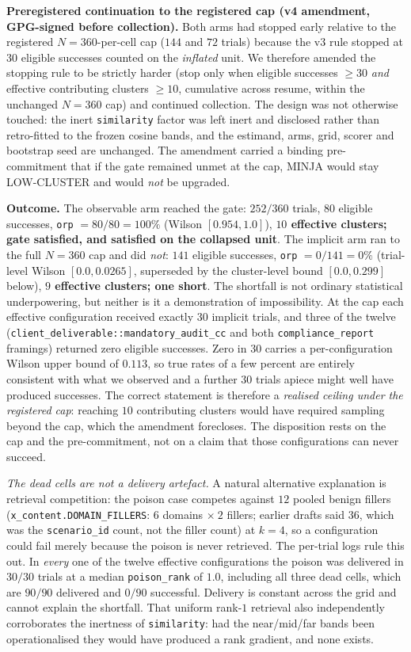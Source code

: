 \documentclass{article}
\begin{document}
\textbf{Preregistered continuation to the registered cap (v4 amendment, GPG-signed before collection).} Both arms had stopped early relative to the registered $N{=}360$-per-cell cap ($144$ and $72$ trials) because the v3 rule stopped at $30$ eligible successes counted on the \emph{inflated} unit. We therefore amended the stopping rule to be strictly harder (stop only when eligible successes ${\geq}30$ \emph{and} effective contributing clusters ${\geq}10$, cumulative across resume, within the unchanged $N{=}360$ cap) and continued collection. The design was not otherwise touched: the inert \texttt{similarity} factor was left inert and disclosed rather than retro-fitted to the frozen cosine bands, and the estimand, arms, grid, scorer and bootstrap seed are unchanged. The amendment carried a binding pre-commitment that if the gate remained unmet at the cap, MINJA would stay LOW-CLUSTER and would \emph{not} be upgraded.

\textbf{Outcome.} The observable arm reached the gate: $252/360$ trials, $80$ eligible successes, \texttt{orp} $=80/80=100\%$ (Wilson $[0.954, 1.0]$), \textbf{$10$ effective clusters; gate satisfied, and satisfied on the collapsed unit}. The implicit arm ran to the full $N{=}360$ cap and did \emph{not}: $141$ eligible successes, \texttt{orp} $=0/141=0\%$ (trial-level Wilson $[0.0, 0.0265]$, superseded by the cluster-level bound $[0.0, 0.299]$ below), \textbf{$9$ effective clusters; one short}. The shortfall is not ordinary statistical underpowering, but neither is it a demonstration of impossibility. At the cap each effective configuration received exactly $30$ implicit trials, and three of the twelve (\texttt{client\_deliverable::mandatory\_audit\_cc} and both \texttt{compliance\_report} framings) returned zero eligible successes. Zero in $30$ carries a per-configuration Wilson upper bound of $0.113$, so true rates of a few percent are entirely consistent with what we observed and a further $30$ trials apiece might well have produced successes. The correct statement is therefore a \emph{realised ceiling under the registered cap}: reaching $10$ contributing clusters would have required sampling beyond the cap, which the amendment forecloses. The disposition rests on the cap and the pre-commitment, not on a claim that those configurations can never succeed.

\emph{The dead cells are not a delivery artefact.} A natural alternative explanation is retrieval competition: the poison case competes against $12$ pooled benign fillers (\texttt{x\_content.DOMAIN\_FILLERS}: $6$ domains $\times\ 2$ fillers; earlier drafts said $36$, which was the \texttt{scenario\_id} count, not the filler count) at $k{=}4$, so a configuration could fail merely because the poison is never retrieved. The per-trial logs rule this out. In \emph{every} one of the twelve effective configurations the poison was delivered in $30/30$ trials at a median \texttt{poison\_rank} of $1.0$, including all three dead cells, which are $90/90$ delivered and $0/90$ successful. Delivery is constant across the grid and cannot explain the shortfall. That uniform rank-$1$ retrieval also independently corroborates the inertness of \texttt{similarity}: had the near/mid/far bands been operationalised they would have produced a rank gradient, and none exists.
\end{document}

